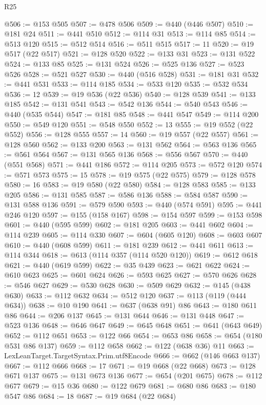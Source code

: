 \begin{lexlean}{R25}
\begin{coremodule}
{{{{{{{{{{{{{{{{{{{{{{{{{{{{{{{{{{{{{{{{{{{{{{{{{{{{{{{{{{{{{{{{{{{{{{{{{{{{{{{{{{{{{{{{{{{{{{{{{{{{{{{{{{{{{{{{{{{{{{{{{{{{{{{{{{{{{{{{{{{{{{{{{{{{{{{{{{{{{{{{{{{{{{{{{{{{{{{{{{{{{{{{{{{{{{{{{{{{{{{@506 := @153 @505
@507 := @478 @506
@509 := @440 (@446 @507)
@510 := @181 @24
@511 := @441 @510
@512 := @114 @31
@513 := @114 @85
@514 := @513 @120
@515 := @512 @514
@516 := @511 @515
@517 := 11
@520 := @19 @517 (@22 @517)
@521 := @128 @520
@522 := @133 @31
@523 := @131 @522
@524 := @133 @85
@525 := @131 @524
@526 := @525 @136
@527 := @523 @526
@528 := @521 @527
@530 := @440 (@516 @528)
@531 := @181 @31
@532 := @441 @531
@533 := @114 @185
@534 := @533 @120
@535 := @532 @534
@536 := 12
@539 := @19 @536 (@22 @536)
@540 := @128 @539
@541 := @133 @185
@542 := @131 @541
@543 := @542 @136
@544 := @540 @543
@546 := @440 (@535 @544)
@547 := @181 @85
@548 := @441 @547
@549 := @114 @200
@550 := @549 @120
@551 := @548 @550
@552 := 13
@555 := @19 @552 (@22 @552)
@556 := @128 @555
@557 := 14
@560 := @19 @557 (@22 @557)
@561 := @128 @560
@562 := @133 @200
@563 := @131 @562
@564 := @563 @136
@565 := @561 @564
@567 := @131 @565 @136
@568 := @556 @567
@570 := @440 (@551 @568)
@571 := @441 @186
@572 := @114 @205
@573 := @572 @120
@574 := @571 @573
@575 := 15
@578 := @19 @575 (@22 @575)
@579 := @128 @578
@580 := 16
@583 := @19 @580 (@22 @580)
@584 := @128 @583
@585 := @133 @205
@586 := @131 @585
@587 := @586 @136
@588 := @584 @587
@590 := @131 @588 @136
@591 := @579 @590
@593 := @440 (@574 @591)
@595 := @441 @246 @120
@597 := @155 (@158 @167)
@598 := @154 @597
@599 := @153 @598
@601 := @440 (@595 @599)
@602 := @181 @205
@603 := @441 @602
@604 := @114 @239
@605 := @114 @330
@607 := @604 (@605 @120)
@608 := @603 @607
@610 := @440 (@608 @599)
@611 := @181 @239
@612 := @441 @611
@613 := @114 @344
@618 := @613 (@114 @357 (@114 @520 @120))
@619 := @612 @618
@621 := @440 (@619 @599)
@622 := @35 @439
@623 := @621 @622
@624 := @610 @623
@625 := @601 @624
@626 := @593 @625
@627 := @570 @626
@628 := @546 @627
@629 := @530 @628
@630 := @509 @629
@632 := @145 (@438 @630)
@633 := @112 @632
@634 := @512 @120
@637 := @113 (@119 (@444 @634))
@638 := @10 @190
@641 := @637 (@638 @91) @86
@643 := @180 @611 @86
@644 := @206 @137
@645 := @131 @644
@646 := @131 @448
@647 := @523 @136
@648 := @646 @647
@649 := @645 @648
@651 := @641 (@643 @649)
@652 := @112 @651
@653 := @122 @66
@654 := @653 @86
@658 := @654 (@180 @531 @86 @137)
@659 := @112 @658
@662 := @122 (@638 @36) @11
@663 := LexLeanTarget.TargetSyntax.Prim.utf8Encode
@666 := @662 (@146 @663 @137)
@667 := @112 @666
@668 := 17
@671 := @19 @668 (@22 @668)
@673 := @128 @671 @137
@675 := @131 @673 @136
@677 := @654 (@201 @675)
@678 := @112 @677
@679 := @15 @36
@680 := @122 @679
@681 := @680 @86
@683 := @180 @547 @86
@684 := 18
@687 := @19 @684 (@22 @684)
}}}}}}}}}}}}}}}}}}}}}}}}}}}}}}}}}}}}}}}}}}}}}}}}}}}}}}}}}}}}}}}}}}}}}}}}}}}}}}}}}}}}}}}}}}}}}}}}}}}}}}}}}}}}}}}}}}}}}}}}}}}}}}}}}}}}}}}}}}}}}}}}}}}}}}}}}}}}}}}}}}}}}}}}}}}}}}}}}}}}}}}}}}}}}}}}}}}}}}}
\end{coremodule}
\end{lexlean}
